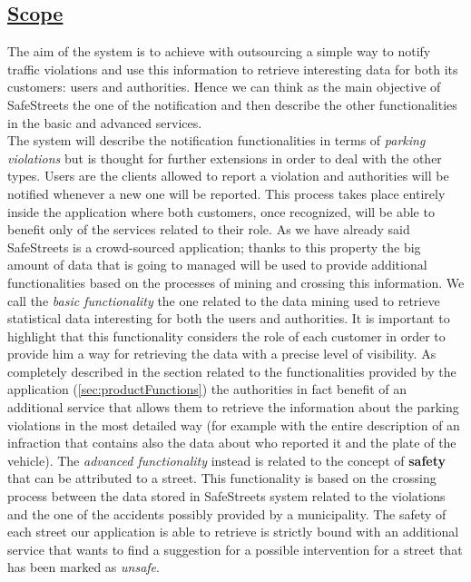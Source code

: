 \subsection[Scope]{\hyperlink{toc}{Scope}}
	The aim of the system is to achieve with outsourcing a simple way to notify traffic violations and use this information to retrieve interesting data for both its customers: users and authorities. Hence we can think as the main objective of SafeStreets the one of the notification and then describe the other functionalities in the basic and advanced services.\\
	
	The system will describe the notification functionalities in terms of \emph{parking violations} but is thought for further extensions in order to deal with the other types. Users are the clients allowed to report a violation and authorities will be notified whenever a new one will be reported. This process takes place entirely inside the application where both customers, once recognized, will be able to benefit only of the services related to their role. As we have already said SafeStreets is a crowd-sourced application; thanks to this property the big amount of data that is going to managed will be used to provide additional functionalities based on the processes of mining and crossing this information. We call the \emph{basic functionality} the one related to the data mining used to retrieve statistical data interesting for both the users and authorities. It is important to highlight that this functionality considers the role of each customer in order to provide him a way for retrieving the data with a precise level of visibility. As completely described in the section related to the functionalities provided by the application (\ref{sec:productFunctions}) the authorities in fact benefit of an additional service that allows them to retrieve the information about the parking violations in the most detailed way (for example with the entire description of an infraction that contains also the data about who reported it and the plate of the vehicle). The \emph{advanced functionality} instead is related to the concept of \textbf{safety} that can be attributed to a street. This functionality is based on the crossing process between the data stored in SafeStreets system related to the violations and the one of the accidents possibly provided by a municipality. The safety of each street our application is able to retrieve is strictly bound with an additional service that wants to find a suggestion for a possible intervention for a street that has been marked as \emph{unsafe}.\\
	
